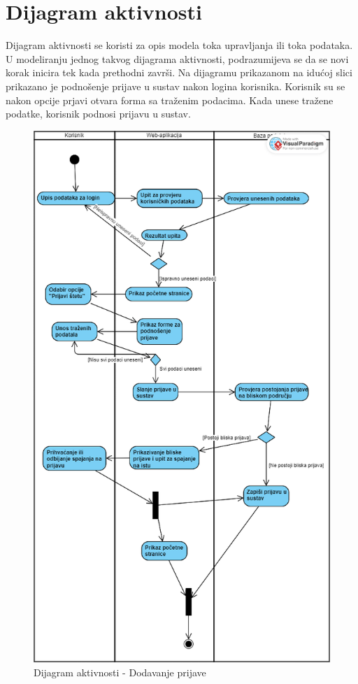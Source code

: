 		\section{Dijagram aktivnosti}
			
			Dijagram aktivnosti se koristi za opis modela toka upravljanja ili toka podataka. U modeliranju jednog takvog dijagrama aktivnosti, podrazumijeva se da se novi korak inicira tek kada prethodni završi. Na dijagramu prikazanom na idućoj slici prikazano je podnošenje prijave u sustav nakon logina korisnika. Korisnik su se nakon opcije prjavi otvara forma sa traženim podacima. Kada unese tražene podatke, korisnik podnosi prijavu u sustav.
			
			
			\begin{figure}[H]
			\includegraphics[scale=0.4]{slike/ActivityDiagram.PNG} %
			\centering
			\caption{Dijagram aktivnosti - Dodavanje prijave}
			\label{fig:bazapod}
		\end{figure}
			
